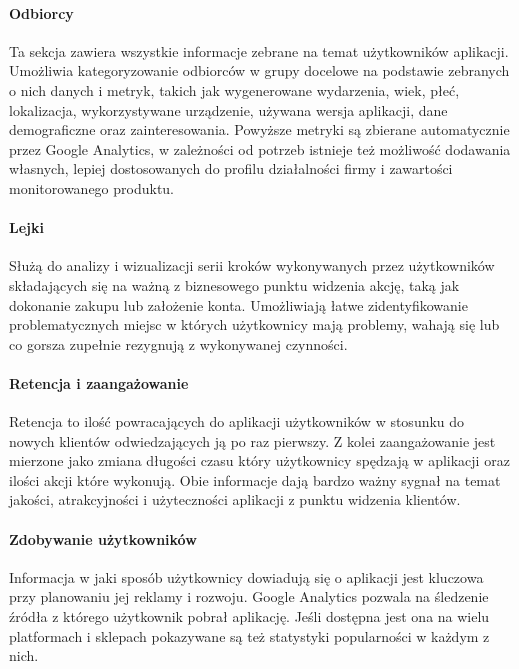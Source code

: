 \paragraph{Odbiorcy}
Ta sekcja zawiera wszystkie informacje zebrane na temat użytkowników aplikacji. Umożliwia kategoryzowanie odbiorców w grupy docelowe na podstawie zebranych o nich danych i metryk, takich jak wygenerowane wydarzenia, wiek, płeć, lokalizacja, wykorzystywane urządzenie, używana wersja aplikacji, dane demograficzne oraz zainteresowania. Powyższe metryki są zbierane automatycznie przez Google Analytics, w zależności od potrzeb istnieje też możliwość dodawania własnych, lepiej dostosowanych do profilu działalności firmy i zawartości monitorowanego produktu.

\paragraph{Lejki}
Służą do analizy i wizualizacji serii kroków wykonywanych przez użytkowników składających się na ważną z biznesowego punktu widzenia akcję, taką jak dokonanie zakupu lub założenie konta. Umożliwiają łatwe zidentyfikowanie problematycznych miejsc w których użytkownicy mają problemy, wahają się lub co gorsza  zupełnie rezygnują z wykonywanej czynności.

\paragraph{Retencja i zaangażowanie} 
Retencja to ilość powracających do aplikacji  użytkowników w stosunku do nowych klientów odwiedzających ją po raz pierwszy. Z kolei zaangażowanie jest mierzone jako zmiana długości czasu który użytkownicy spędzają w aplikacji oraz ilości akcji które wykonują. Obie informacje dają bardzo ważny sygnał na temat jakości, atrakcyjności i użyteczności aplikacji z punktu widzenia klientów.

\paragraph{Zdobywanie użytkowników}
Informacja w jaki sposób użytkownicy dowiadują się o aplikacji jest kluczowa przy planowaniu jej reklamy i rozwoju. Google Analytics pozwala na śledzenie źródła z którego użytkownik pobrał aplikację. Jeśli dostępna jest ona na wielu platformach i sklepach pokazywane są też statystyki popularności w każdym z nich.
